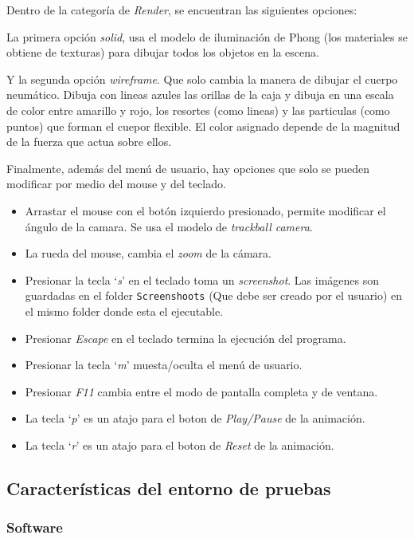 Dentro de la categoría de \emph{\textenglish{Render}}, se encuentran las siguientes opciones:

La primera opción \emph{\textenglish{solid}}, usa el modelo de iluminación de Phong (los materiales se obtiene de texturas) para dibujar todos los objetos en la escena.

Y la segunda opción \emph{\textenglish{wireframe}}. 
Que solo cambia la manera de dibujar el cuerpo neumático.
Dibuja con lineas azules las orillas de la caja y dibuja en una escala de color entre amarillo y rojo, los resortes (como lineas) y las particulas (como puntos) que forman el cuepor flexible.
El color asignado depende de la magnitud de la fuerza que actua sobre ellos.

Finalmente, además del menú de usuario, hay opciones que solo se pueden modificar por medio del \textenglish{mouse} y del teclado.

\begin{itemize}
 \item Arrastar el mouse con el botón izquierdo presionado, permite modificar el ángulo de la camara. Se usa el modelo de \emph{\textenglish{trackball camera}}.
 \item La rueda del mouse, cambia el \emph{\textenglish{zoom}} de la cámara.
 \item Presionar la tecla `\emph{s}' en el teclado toma un \emph{\textenglish{screenshot}}. Las imágenes son guardadas en el folder \texttt{Screenshoots} (Que debe ser creado por el usuario) en el mismo folder donde esta el ejecutable.
 \item Presionar \emph{Escape} en el teclado termina la ejecución del programa.
 \item Presionar la tecla `\emph{m}' muesta/oculta el menú de usuario.
 \item Presionar \emph{F11} cambia entre el modo de pantalla completa y de ventana.
 \item La tecla `\emph{p}' es un atajo para el boton de \emph{\textenglish{Play/Pause}} de la animación.
 \item La tecla `\emph{r}' es un atajo para el boton de \emph{\textenglish{Reset}} de la animación.
\end{itemize}

\subsection{Características del entorno de pruebas}

\subsubsection{Software}

